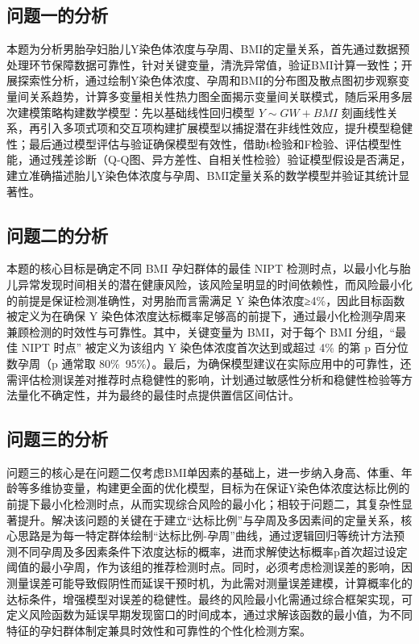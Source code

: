 \documentclass[withoutpreface,bwprint]{cumcmthesis} %
\begin{document}
\subsection{问题一的分析}

本题为分析男胎孕妇胎儿Y染色体浓度与孕周、BMI的定量关系，首先通过数据预处理环节保障数据可靠性，针对关键变量，清洗异常值，验证BMI计算一致性；开展探索性分析，通过绘制Y染色体浓度、孕周和BMI的分布图及散点图初步观察变量间关系趋势，计算多变量相关性热力图全面揭示变量间关联模式，随后采用多层次建模策略构建数学模型：先以基础线性回归模型 $Y \sim GW + BMI$ 刻画线性关系，再引入多项式项和交互项构建扩展模型以捕捉潜在非线性效应，提升模型稳健性；最后通过模型评估与验证确保模型有效性，借助t检验和F检验、评估模型性能，通过残差诊断（Q-Q图、异方差性、自相关性检验）验证模型假设是否满足，建立准确描述胎儿Y染色体浓度与孕周、BMI定量关系的数学模型并验证其统计显著性。

\subsection{问题二的分析}

本题的核心目标是确定不同 BMI 孕妇群体的最佳 NIPT 检测时点，以最小化与胎儿异常发现时间相关的潜在健康风险，该风险呈明显的时间依赖性，而风险最小化的前提是保证检测准确性，对男胎而言需满足 Y 染色体浓度≥4\%，因此目标函数被定义为在确保 Y 染色体浓度达标概率足够高的前提下，通过最小化检测孕周来兼顾检测的时效性与可靠性。其中，关键变量为 BMI，对于每个 BMI 分组，“最佳 NIPT 时点” 被定义为该组内 Y 染色体浓度首次达到或超过 4\% 的第 p 百分位数孕周（p 通常取 80\%~95\%）。最后，为确保模型建议在实际应用中的可靠性，还需评估检测误差对推荐时点稳健性的影响，计划通过敏感性分析和稳健性检验等方法量化不确定性，并为最终的最佳时点提供置信区间估计。
 

\subsection{问题三的分析}
问题三的核心是在问题二仅考虑BMI单因素的基础上，进一步纳入身高、体重、年龄等多维协变量，构建更全面的优化模型，目标为在保证Y染色体浓度达标比例的前提下最小化检测时点，从而实现综合风险的最小化；相较于问题二，其复杂性显著提升。解决该问题的关键在于建立“达标比例”与孕周及多因素间的定量关系，核心思路是为每一特定群体绘制“达标比例-孕周”曲线，通过逻辑回归等统计方法预测不同孕周及多因素条件下浓度达标的概率，进而求解使达标概率p首次超过设定阈值的最小孕周，作为该组的推荐检测时点。同时，必须考虑检测误差的影响，因测量误差可能导致假阴性而延误干预时机，为此需对测量误差建模，计算概率化的达标条件，增强模型对误差的稳健性。最终的风险最小化需通过综合框架实现，可定义风险函数为延误早期发现窗口的时间成本，通过求解该函数的最小值，为不同特征的孕妇群体制定兼具时效性和可靠性的个性化检测方案。
\end{document}
